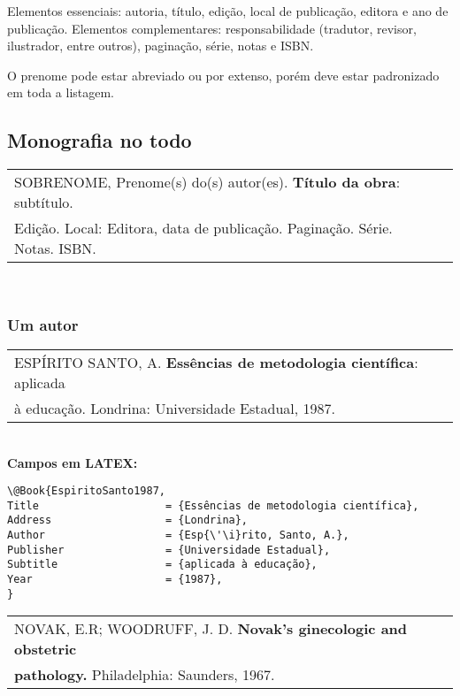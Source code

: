 Elementos essenciais: autoria, título, edição, local de publicação, editora e ano de publicação.
Elementos complementares: responsabilidade (tradutor, revisor, ilustrador, entre outros), paginação, série, notas e ISBN.
	
O prenome pode estar abreviado ou por extenso, porém deve estar padronizado em toda a listagem. 
	
\subsection{Monografia no todo}
	
\begin{tabular}{|l|c|} \hline
	SOBRENOME, Prenome(s) do(s) autor(es). \textbf{Título da obra}: subtítulo. \\Edição. 
	Local:	Editora, data de publicação. Paginação. Série. Notas. ISBN.      \\\hline
\end{tabular}\\
	
\subsubsection{Um autor}
	
\begin{tabular}{|l|c|} \hline
	ESPÍRITO SANTO, A. \textbf{Essências de metodologia científica}: aplicada \\
	à educação. Londrina: Universidade Estadual, 1987.                        \\\hline
\end{tabular}\\
	
\textbf{Campos em LATEX:}
	
\begingroup
\fontsize{10pt}{12pt}\selectfont
\begin{verbatim}
\@Book{EspiritoSanto1987,
Title                    = {Essências de metodologia científica},
Address                  = {Londrina},
Author                   = {Esp{\'\i}rito, Santo, A.},
Publisher                = {Universidade Estadual},
Subtitle                 = {aplicada à educação},
Year                     = {1987},
}
\end{verbatim}
\endgroup
	
\begin{tabular}{|l|c|} \hline
	NOVAK, E.R; WOODRUFF, J. D. \textbf{Novak's ginecologic and obstetric} \\ \textbf{pathology.} Philadelphia: Saunders, 1967. \\\hline
\end{tabular}\\
	
